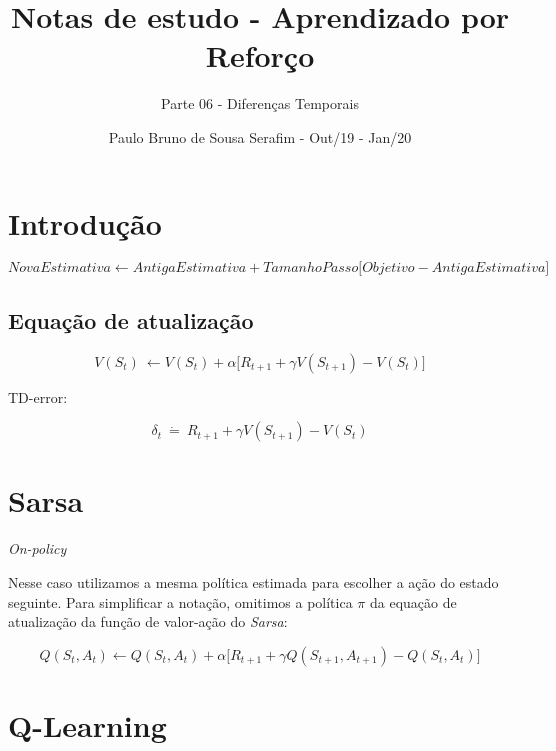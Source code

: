 \documentclass{article}
\title{Notas de estudo - Aprendizado por Reforço}
\author{Parte 06 - Diferenças Temporais}
\date{Paulo Bruno de Sousa Serafim - Out/19 - Jan/20}
\begin{document}
\maketitle

    \section{Introdução}
    
        \begin{equation}
            NovaEstimativa \leftarrow AntigaEstimativa + TamanhoPasso \Big[ Objetivo - AntigaEstimativa \Big]
        \end{equation}
        
        \subsection{Equação de atualização}
        
            \begin{equation}
                V(S_t) \ \leftarrow V(S_t) + \alpha \Big[ R_{t+1} + \gamma V(S_{t+1}) - V(S_t) \Big]
            \end{equation}
        
            TD-error:
            
            \begin{equation}
                \delta_t \ \dot{=} \ R_{t+1} + \gamma V(S_{t+1}) - V(S_t)
            \end{equation}
        
    \section{Sarsa}
    
        \textit{On-policy}
    
        Nesse caso utilizamos a mesma política estimada para escolher a ação do estado seguinte. Para simplificar a notação, omitimos a política $\pi$ da equação de atualização da função de valor-ação do \textit{Sarsa}:
    
        \begin{equation}
            Q(S_t, A_t) \leftarrow Q(S_t, A_t) + \alpha \Big[ R_{t+1} + \gamma Q(S_{t+1}, A_{t+1}) - Q(S_t, A_t) \Big]
        \end{equation}
        
    \section{Q-Learning}
    
\end{document}
